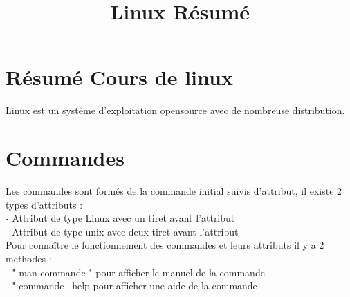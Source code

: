 \documentclass[11pt,a4peper]{article}
\begin{document}
\title{Linux Résumé}

\section{\textbf{Résumé Cours de linux}}

Linux est un système d’exploitation opensource avec de nombreuse distribution.

\section{\textbf{Commandes}}

Les commandes sont formés de la commande initial suivis d’attribut, il existe 2 types d’attributs :\\
- Attribut de type Linux avec un tiret avant l’attribut\\
- Attribut de type unix avec deux tiret avant l’attribut\\
Pour connaître le fonctionnement des commandes et leurs attributs il y a 2 methodes :\\
- " man commande " pour afficher le manuel de la commande\\
- " commande --help pour afficher une aide de la commande\\
\end{document}
